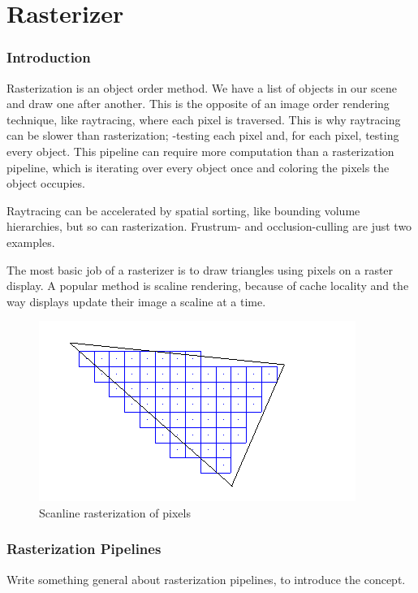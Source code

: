 \part{Rasterizer}


\section{Introduction}
Rasterization is an object order method. We have a list of objects in our scene and draw one after another. This is the opposite of an image order rendering technique, like raytracing, where each pixel is traversed. This is why raytracing can be slower than rasterization; -testing each pixel and, for each pixel, testing every object. This pipeline can require more computation than a rasterization pipeline, which is iterating over every object once and coloring the pixels the object occupies.

Raytracing can be accelerated by spatial sorting, like bounding volume hierarchies, but so can rasterization. Frustrum- and occlusion-culling are just two examples.

The most basic job of a rasterizer is to draw triangles using pixels on a raster display. A popular method is scaline rendering, because of cache locality and the way displays update their image a scaline at a time.

\begin{figure}[H]
  \centering
  \includegraphics{Media/raster_scanline.png}
  \caption{Scanline rasterization of pixels}   
  \label{fig:Scanline rasterization of pixels}
\end{figure}


\section{Rasterization Pipelines}

Write something general about rasterization pipelines, to introduce the concept.


